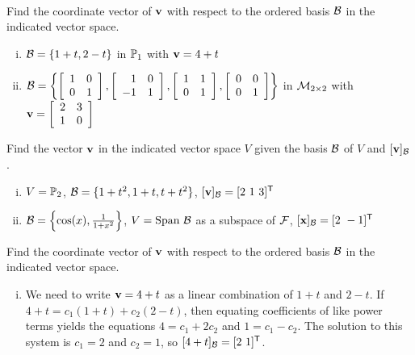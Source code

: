 \label{sec:coord_vec_exam}

\ExampleIntro

\begin{example} ~
	\ba
	\item Find the coordinate vector of $\mathbf{v}$ with respect to the ordered basis $\mathcal{B}$ in the indicated vector space.
		\begin{enumerate}[i.]
		\item $\mathcal{B} = \{1+t, 2-t\}$ in $\mathbb{P}_1$ with $\mathbf{v} = 4+t$
	
		\item $\mathcal{B} = \left\{ \left[ \begin{array}{cc} 1&0\\0&1 \end{array} \right],  \left[ \begin{array}{rc} 1&0\\-1&1 \end{array} \right], \left[ \begin{array}{cc} 1&1\\0&1 \end{array} \right], \left[ \begin{array}{cc} 0&0\\0&1 \end{array} \right] \right\}$ in $\mathcal{M}_{2 \times 2}$ with $\mathbf{v} = \left[ \begin{array}{cc} 2&3\\1&0 \end{array} \right]$
		\end{enumerate}
	
	\item Find the vector $\mathbf{v}$ in the indicated vector space $V$ given the basis $\mathcal{B}$ of $V$ and $[\mathbf{v}]_{\mathcal{B}}$.
		\begin{enumerate}[i.]
		\item $V = \mathbb{P}_2$, $\mathcal{B} = \{1+t^2, 1+t, t+t^2\}$, $[\mathbf{v}]_{\mathcal{B}} = [2 \ 1 \ 3]^{\mathsf{T}}$
		
		\item $\mathcal{B} = \left\{\cos(x), \frac{1}{1+x^2}\right\}$, $V = \Span \ \CB$ as a subspace of $\mathcal{F}$, $[\mathbf{x}]_{\mathcal{B}} = [2 \ -1]^{\mathsf{T}}$
		
		\end{enumerate}
	
	\ea

\ExampleSolution

	\ba
	\item Find the coordinate vector of $\mathbf{v}$ with respect to the ordered basis $\mathcal{B}$ in the indicated vector space.
		\begin{enumerate}[i.]
		\item We need to write $\mathbf{v} =4+t$ as a linear combination of $1+t$ and $2-t$. If $4+t = c_1(1+t) + c_2(2-t)$, then equating coefficients of like power terms yields the equations $4 = c_1 +2c_2$ and $1 = c_1-c_2$. The solution to this system is $c_1 = 2$ and $c_2 = 1$, so $[4+t]_{\CB} = [2 \ 1]^{\tr}$.  
		

\end{enumerate}
\end{example}

